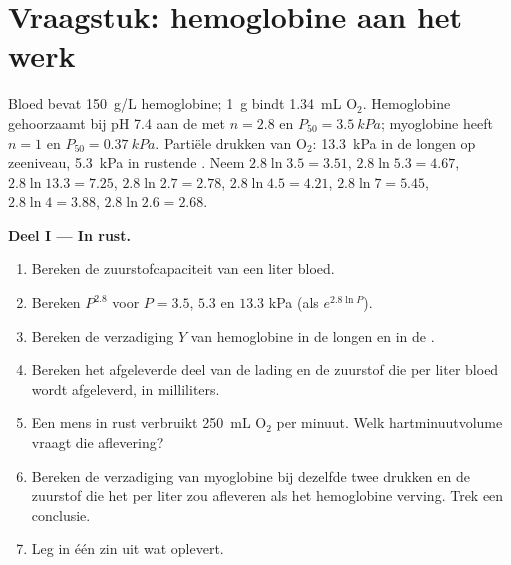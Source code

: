 \section{Vraagstuk: hemoglobine aan het werk}

\begin{problem}
\label{pb:b1:proteins:1}
Bloed bevat \qty{150}{g/L} hemoglobine; \qty{1}{g} bindt \qty{1.34}{mL}
$\mathrm{O_2}$. Hemoglobine gehoorzaamt bij pH 7.4 aan de  met
$n = 2.8$ en $P_{50} = \qty{3.5}{kPa}$; myoglobine heeft $n = 1$ en
$P_{50} = \qty{0.37}{kPa}$. Partiële drukken van $\mathrm{O_2}$: \qty{13.3}{kPa}
in de longen op zeeniveau, \qty{5.3}{kPa} in rustende . Neem
$2.8\ln 3.5 = 3.51$, $2.8\ln 5.3 = 4.67$, $2.8\ln 13.3 = 7.25$,
$2.8\ln 2.7 = 2.78$, $2.8\ln 4.5 = 4.21$, $2.8\ln 7 = 5.45$,
$2.8\ln 4 = 3.88$, $2.8\ln 2.6 = 2.68$.

\medskip
\noindent\textbf{Deel I --- In rust.}
\begin{enumerate}
  \item Bereken de zuurstofcapaciteit van een liter bloed.
  \item Bereken $P^{2.8}$ voor $P = 3.5$, $5.3$ en $13.3$ kPa (als
        $e^{2.8\ln P}$).
  \item Bereken de verzadiging $Y$ van hemoglobine in de longen en in de
        .
  \item Bereken het afgeleverde deel van de lading en de zuurstof die per
        liter bloed wordt afgeleverd, in milliliters.
  \item Een mens in rust verbruikt \qty{250}{mL} $\mathrm{O_2}$ per minuut.
        Welk hartminuutvolume vraagt die aflevering?
  \item Bereken de verzadiging van myoglobine bij dezelfde twee drukken en
        de zuurstof die het per liter zou afleveren als het hemoglobine
        verving. Trek een conclusie.
  \item Leg in één zin uit wat  oplevert.
\end{enumerate}


\end{problem}
